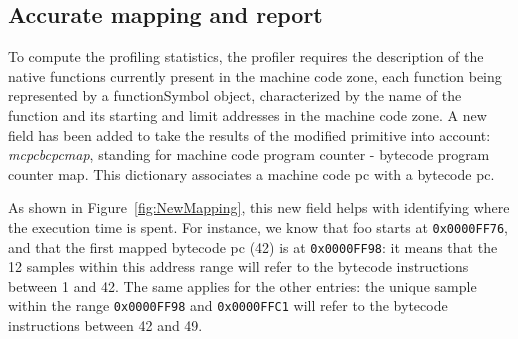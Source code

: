 \documentclass[10pt,preprint,nonatbib]{sigplanconf}
\newcommand{\ct}{\lstinline[backgroundcolor=\color{white},basicstyle=\small\ttfamily]}
\newcommand{\figref}[1]{Figure~\ref{fig:#1}}
\begin{document}
%

\subsection{Accurate mapping and report}

To compute the profiling statistics, the profiler requires the description of the native functions currently present in the machine code zone, each function being represented by a functionSymbol object, characterized by the name of the function and its starting and limit addresses in the machine code zone.
A new field has been added to take the results of the modified primitive into account: \textit{mcpcbcpcmap}, standing for machine code program counter - bytecode program counter map. This dictionary associates a machine code pc with a bytecode pc.

As shown in \figref{NewMapping}, this new field helps with identifying where the execution time is spent. For instance, we know that foo starts at \ct{0x0000FF76}, and that the first mapped bytecode pc (42) is at \ct{0x0000FF98}: it means that the 12 samples within this address range will refer to the bytecode instructions between 1 and 42.
The same applies for the other entries: the unique sample within the range \ct{0x0000FF98} and \ct{0x0000FFC1} will refer to the bytecode instructions between 42 and 49. 
\end{document}
